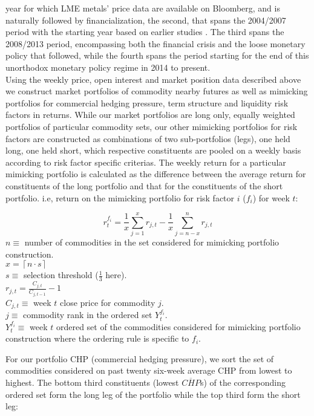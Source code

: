 \documentclass[11pt, letterpaper, doublespacing]{article}
\begin{document}
year for which LME metals' price data are available on Bloomberg, and is
naturally followed by financialization, the second, that spans the
2004/2007 period with the starting year based on earlier studies
\citep{baker_financialization_2014, christoffersen_factor_2014}. The
third spans the 2008/2013 period, encompassing both the financial crisis
and the loose monetary policy that followed, while the fourth spans the
period starting for the end of this unorthodox monetary policy regime in
2014 to present.\\
Using the weekly price, open interest and market position data described
above we construct market portfolios of commodity nearby futures as well
as mimicking portfolios for commercial hedging pressure, term structure
and liquidity risk factors in returns. While our market portfolios are
long only, equally weighted portfolios of particular commodity sets, our
other mimicking portfolios for risk factors are constructed as
combinations of two sub-portfolios (legs), one held long, one held
short, which respective constituents are pooled on a weekly basis
according to risk factor specific criterias. The weekly return for a
particular mimicking portfolio is calculated as the difference between
the average return for constituents of the long portfolio and that for
the constituents of the short portfolio. i.e, return on the mimicking
portfolio for risk factor \(i\) (\(f_{i}\)) for week \(t\):

\[r_{t}^{f_{i}}=\frac{1}{x}\sum_{j=1}^{x}r_{j,t}-\frac{1}{x}\sum_{j=n-x}^{n}r_{j,t}\]
\(n\equiv\) number of commodities in the set considered for mimicking
portfolio construction.\\
\(x = \left \lceil n \cdot s \right \rceil\)\\
\(s\equiv\) selection threshold (\(\frac{1}{3}\) here).\\
\(r_{j,t}=\frac{C_{j,t}}{C_{j,t-1}}-1\)\\
\(C_{j,t}\equiv\) week \(t\) close price for commodity \(j\).\\
\(j\equiv\) commodity rank in the ordered set \(Y_{t}^{f_{i}}\).\\
\(Y_{t}^{f_{i}}\equiv\) week \(t\) ordered set of the commodities
considered for mimicking portfolio construction where the ordering rule
is specific to \(f_{i}\).

For our portfolio CHP (commercial hedging pressure), we sort the set of
commodities considered on past twenty six-week average CHP from lowest
to highest. The bottom third constituents (lowest \(\overline{CHP}\)s)
of the corresponding ordered set form the long leg of the portfolio
while the top third form the short leg:
\end{document}

